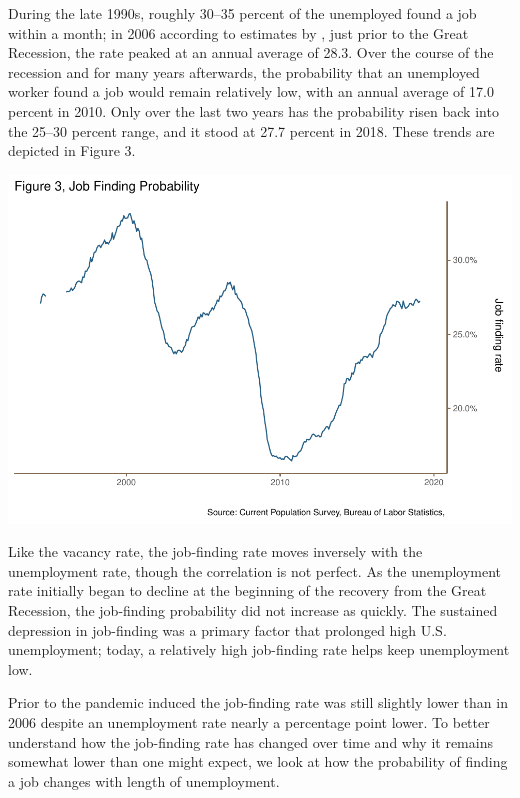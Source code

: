 \documentclass[
  11pt,
]{article}
\begin{document}
During the late 1990s, roughly 30--35 percent of the unemployed found a
job within a month; in 2006 according to estimates by \cite{Fallick04},
just prior to the Great Recession, the rate peaked at an annual average
of 28.3. Over the course of the recession and for many years afterwards,
the probability that an unemployed worker found a job would remain
relatively low, with an annual average of 17.0 percent in 2010. Only
over the last two years has the probability risen back into the 25--30
percent range, and it stood at 27.7 percent in 2018. These trends are
depicted in Figure 3.

\begin{center}\includegraphics{JOLTS_files/figure-latex/unnamed-chunk-7-1} \end{center}

Like the vacancy rate, the job-finding rate moves inversely with the
unemployment rate, though the correlation is not perfect. As the
unemployment rate initially began to decline at the beginning of the
recovery from the Great Recession, the job-finding probability did not
increase as quickly. The sustained depression in job-finding was a
primary factor that prolonged high U.S. unemployment; today, a
relatively high job-finding rate helps keep unemployment low.

Prior to the pandemic induced the job-finding rate was still slightly
lower than in 2006 despite an unemployment rate nearly a percentage
point lower. To better understand how the job-finding rate has changed
over time and why it remains somewhat lower than one might expect, we
look at how the probability of finding a job changes with length of
unemployment.
\end{document}
